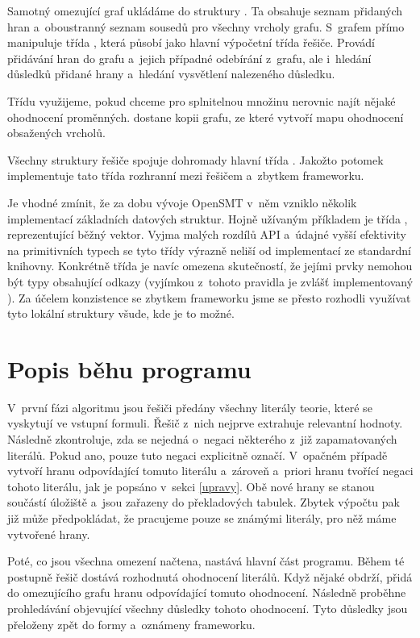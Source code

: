 Samotný omezující graf ukládáme do struktury . Ta obsahuje seznam přidaných hran a~oboustranný seznam sousedů pro všechny vrcholy grafu. S~grafem přímo manipuluje třída , která působí jako hlavní výpočetní třída řešiče. Provádí přidávání hran do grafu a~jejich případné odebírání z~grafu, ale i~hledání důsledků přidané hrany a~hledání vysvětlení nalezeného důsledku.

Třídu  využijeme, pokud chceme pro splnitelnou množinu nerovnic najít nějaké ohodnocení proměnných.  dostane kopii grafu, ze které vytvoří mapu ohodnocení obsažených vrcholů.

Všechny struktury řešiče spojuje dohromady hlavní třída . Jakožto potomek  implementuje tato třída rozhranní mezi řešičem a~zbytkem frameworku. %

Je vhodné zmínit, že za dobu vývoje OpenSMT v~něm vzniklo několik implementací základních datových struktur. Hojně užívaným příkladem je třída , reprezentující běžný vektor. Vyjma malých rozdílů API a~údajné vyšší efektivity na primitivních typech se tyto třídy výrazně neliší od implementací ze standardní knihovny. Konkrétně třída  je navíc omezena skutečností, že jejími prvky nemohou být typy obsahující odkazy (vyjímkou z~tohoto pravidla je zvlášť implementovaný ). Za účelem konzistence se zbytkem frameworku jsme se přesto rozhodli využívat tyto lokální struktury všude, kde je to možné. 

\section{Popis běhu programu}

V~první fázi algoritmu jsou řešiči předány všechny literály teorie, které se vyskytují ve vstupní formuli. Řešič z~nich nejprve extrahuje relevantní hodnoty. Následně zkontroluje, zda se nejedná o~negaci některého z~již zapamatovaných literálů. Pokud ano, pouze tuto negaci explicitně označí. V~opačném případě vytvoří hranu odpovídající tomuto literálu a~zároveň a~priori hranu tvořící negaci tohoto literálu, jak je popsáno v~sekci \ref{upravy}. Obě nové hrany se stanou součástí úložiště a~jsou zařazeny do překladových tabulek. Zbytek výpočtu pak již může předpokládat, že pracujeme pouze se známými literály, pro něž máme vytvořené hrany.

Poté, co jsou všechna omezení načtena, nastává hlavní část programu. Během té postupně řešič dostává rozhodnutá ohodnocení literálů. Když nějaké obdrží, přidá do omezujícího grafu hranu odpovídající tomuto ohodnocení. Následně proběhne prohledávání objevující všechny důsledky tohoto ohodnocení. Tyto důsledky jsou přeloženy zpět do formy  a~oznámeny frameworku.


